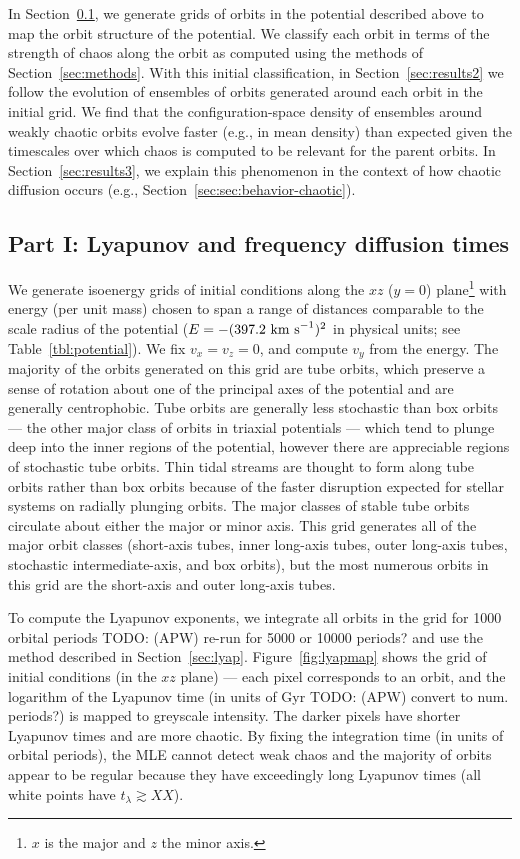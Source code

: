 \documentclass[letterpaper,12pt,preprint]{aastex}
\newcommand{\todo}[2]{{\color{red} TODO: (\MakeUppercase{#1}) #2}}
\begin{document}
In Section~\ref{sec:results1}, we generate grids of orbits in the potential described above to map the orbit structure of the potential. We classify each orbit in terms of the strength of chaos along the orbit as computed using the methods of Section~\ref{sec:methods}. With this initial classification, in Section~\ref{sec:results2} we follow the evolution of ensembles of orbits generated around each orbit in the initial grid. We find that the configuration-space density of ensembles around weakly chaotic orbits evolve faster (e.g., in mean density) than expected given the timescales over which chaos is computed to be relevant for the parent orbits. In Section~\ref{sec:results3}, we explain this phenomenon in the context of how chaotic diffusion occurs (e.g., Section~\ref{sec:sec:behavior-chaotic}).

\subsection{Part I: Lyapunov and frequency diffusion times}\label{sec:results1}

We generate isoenergy grids of initial conditions along the $xz$ ($y=0$) plane\footnote{$x$ is the major and $z$ the minor axis.} with energy (per unit mass) chosen to span a range of distances comparable to the scale radius of the potential ($E=-(397.2~{\rm km~s}^{-1})^2$ in physical units; see Table~\ref{tbl:potential}). We fix $v_x = v_z = 0$, and compute $v_y$ from the energy. The majority of the orbits generated on this grid are tube orbits, which preserve a sense of rotation about one of the principal axes of the potential and are generally centrophobic. Tube orbits are generally less stochastic than box orbits --- the other major class of orbits in triaxial potentials --- which tend to plunge deep into the inner regions of the potential, however there are appreciable regions of stochastic tube orbits. Thin tidal streams are thought to form along tube orbits rather than box orbits because of the faster disruption expected for stellar systems on radially plunging orbits. The major classes of stable tube orbits circulate about either the major or minor axis. This grid generates all of the major orbit classes (short-axis tubes, inner long-axis tubes, outer long-axis tubes, stochastic intermediate-axis, and box orbits), but the most numerous orbits in this grid are the short-axis and outer long-axis tubes. 

To compute the Lyapunov exponents, we integrate all orbits in the grid for 1000 orbital periods \todo{apw}{re-run for 5000 or 10000 periods?} and use the method described in Section~\ref{sec:lyap}. Figure~\ref{fig:lyapmap} shows the grid of initial conditions (in the $xz$ plane) --- each pixel corresponds to an orbit, and the logarithm of the Lyapunov time (in units of Gyr \todo{apw}{ convert to num. periods?}) is mapped to greyscale intensity. The darker pixels have shorter Lyapunov times and are more chaotic. By fixing the integration time (in units of orbital periods), the MLE cannot detect weak chaos and the majority of orbits appear to be regular because they have exceedingly long Lyapunov times (all white points have $t_\lambda \gtrsim XX$). 
\end{document}
